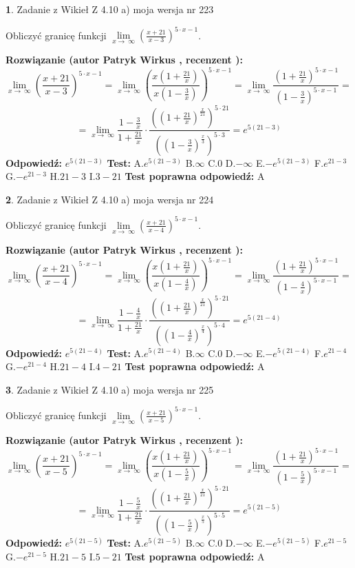 \documentclass[12pt, a4paper]{article}
\theoremstyle{definition} %
\newtheorem{zad}{}
\newcommand{\zadStart}[1]{\begin{zad}#1\newline}
\newcommand{\zadStop}{\end{zad}}
\newcommand{\rozwStart}[2]{\noindent \textbf{Rozwiązanie (autor #1 , recenzent #2): }\newline}
\newcommand{\rozwStop}{\newline}
\newcommand{\odpStart}{\noindent \textbf{Odpowiedź:}\newline}
\newcommand{\odpStop}{\newline}
\newcommand{\testStart}{\noindent \textbf{Test:}\newline}
\newcommand{\testStop}{\newline}
\newcommand{\kluczStart}{\noindent \textbf{Test poprawna odpowiedź:}\newline}
\newcommand{\kluczStop}{\newline}
\begin{document}
\zadStart{Zadanie z Wikieł Z 4.10 a) moja wersja nr 223}


Obliczyć granicę funkcji  $\lim\limits_{x\to\ \infty}(\frac{x+21}{x-3})^{5\cdot x-1}$.
\zadStop
\rozwStart{Patryk Wirkus}{}
$$\lim\limits_{x\to\ \infty}(\frac{x+21}{x-3})^{5\cdot x-1} = \lim\limits_{x\to\ \infty}(\frac{x(1+\frac{21}{x})}{x(1-\frac{3}{x})})^{5\cdot x-1}=\lim\limits_{x\to\ \infty}\frac{(1+\frac{21}{x})^{5\cdot x-1}}{(1-\frac{3}{x})^{5\cdot x-1}}=$$
$$=\lim\limits_{x\to\ \infty}\frac{1-\frac{3}{x}}{1+\frac{21}{x}}\cdot\frac{((1+\frac{21}{x})^{\frac{x}{21}})^{5\cdot21}}{((1-\frac{3}{x})^{\frac{x}{3}})^{5\cdot3}}=e^{5(21-3)}$$
\rozwStop
\odpStart
$e^{5(21-3)}$
\odpStop
\testStart
A.$e^{5(21-3)}$ B.$\infty$ C.$0$ D.$-\infty$ E.$-e^{5(21-3)}$
F.$e^{21-3}$ G.$-e^{21-3}$
H.$21-3$
I.$3-21$
\testStop
\kluczStart
A
\kluczStop



\zadStart{Zadanie z Wikieł Z 4.10 a) moja wersja nr 224}


Obliczyć granicę funkcji  $\lim\limits_{x\to\ \infty}(\frac{x+21}{x-4})^{5\cdot x-1}$.
\zadStop
\rozwStart{Patryk Wirkus}{}
$$\lim\limits_{x\to\ \infty}(\frac{x+21}{x-4})^{5\cdot x-1} = \lim\limits_{x\to\ \infty}(\frac{x(1+\frac{21}{x})}{x(1-\frac{4}{x})})^{5\cdot x-1}=\lim\limits_{x\to\ \infty}\frac{(1+\frac{21}{x})^{5\cdot x-1}}{(1-\frac{4}{x})^{5\cdot x-1}}=$$
$$=\lim\limits_{x\to\ \infty}\frac{1-\frac{4}{x}}{1+\frac{21}{x}}\cdot\frac{((1+\frac{21}{x})^{\frac{x}{21}})^{5\cdot21}}{((1-\frac{4}{x})^{\frac{x}{4}})^{5\cdot4}}=e^{5(21-4)}$$
\rozwStop
\odpStart
$e^{5(21-4)}$
\odpStop
\testStart
A.$e^{5(21-4)}$ B.$\infty$ C.$0$ D.$-\infty$ E.$-e^{5(21-4)}$
F.$e^{21-4}$ G.$-e^{21-4}$
H.$21-4$
I.$4-21$
\testStop
\kluczStart
A
\kluczStop



\zadStart{Zadanie z Wikieł Z 4.10 a) moja wersja nr 225}


Obliczyć granicę funkcji  $\lim\limits_{x\to\ \infty}(\frac{x+21}{x-5})^{5\cdot x-1}$.
\zadStop
\rozwStart{Patryk Wirkus}{}
$$\lim\limits_{x\to\ \infty}(\frac{x+21}{x-5})^{5\cdot x-1} = \lim\limits_{x\to\ \infty}(\frac{x(1+\frac{21}{x})}{x(1-\frac{5}{x})})^{5\cdot x-1}=\lim\limits_{x\to\ \infty}\frac{(1+\frac{21}{x})^{5\cdot x-1}}{(1-\frac{5}{x})^{5\cdot x-1}}=$$
$$=\lim\limits_{x\to\ \infty}\frac{1-\frac{5}{x}}{1+\frac{21}{x}}\cdot\frac{((1+\frac{21}{x})^{\frac{x}{21}})^{5\cdot21}}{((1-\frac{5}{x})^{\frac{x}{5}})^{5\cdot5}}=e^{5(21-5)}$$
\rozwStop
\odpStart
$e^{5(21-5)}$
\odpStop
\testStart
A.$e^{5(21-5)}$ B.$\infty$ C.$0$ D.$-\infty$ E.$-e^{5(21-5)}$
F.$e^{21-5}$ G.$-e^{21-5}$
H.$21-5$
I.$5-21$
\testStop
\kluczStart
A
\kluczStop
\end{document}
